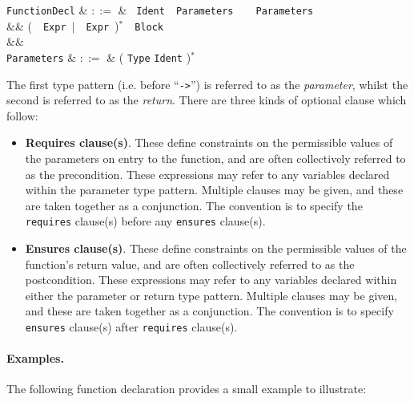 \begin{syntax}
  \verb+FunctionDecl+ & $::=$ & \ \verb+Ident+\ \token{(}\ \verb+Parameters+\ \token{)}\ \token{->}\ \token{(}\ \verb+Parameters+\ \token{)}\\
  && \big(\ \ \verb+Expr+\ $|$\ \ \verb+Expr+\ \big)$^*$\ \token{:}\ \verb+Block+\\
  &&\\
  \verb+Parameters+ & $::=$ & \big( \verb+Type+ \verb+Ident+ \big)$^*$
\end{syntax}

The first type pattern (i.e. before ``\lstinline{->}'') is referred to as the {\em parameter}, whilst the second is referred to as the {\em return}.  There are three kinds of optional clause which follow:

\begin{itemize}

\item {\bf Requires clause(s)}. These define constraints on the permissible values of the parameters on entry to the function, and are often collectively referred to as the \gls{precondition}. These expressions may refer to any variables declared within the parameter type pattern. Multiple clauses may be given, and these are taken together as a conjunction.  The convention is to specify the \lstinline{requires} clause(s) before any \lstinline{ensures} clause(s).

\item {\bf Ensures clause(s)}. These define constraints on the permissible values of the function's return value, and are often collectively referred to as the \gls{postcondition}. These expressions may refer to any variables declared within either the parameter or return type pattern.  Multiple clauses may be given, and these are taken together as a conjunction.  The convention is to specify \lstinline{ensures} clause(s) after \lstinline{requires} clause(s).
\end{itemize}

\paragraph{Examples.}
The following function declaration provides a small example to illustrate:


